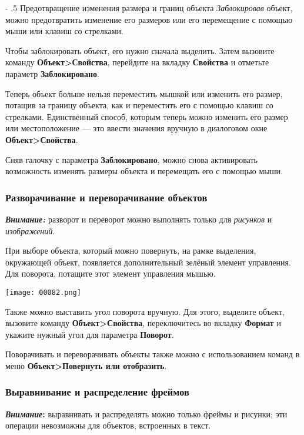 ﻿\documentclass[a4paper,10pt]{article}
\makeatletter
\renewcommand\paragraph{%
   \@startsection{paragraph}{4}{0mm}%
      {-\baselineskip}%
      {.5\baselineskip}%
      {\normalfont\normalsize\bfseries}}
\makeatother
\begin{document}
\paragraph{Предотвращение изменения размера и границ объекта}
\textit{Заблокировав} объект, можно предотвратить изменение его размеров или его перемещение с помощью мыши или клавиш со стрелками.

Чтобы заблокировать объект, его нужно сначала выделить. Затем вызовите команду \textbf{Объект>Свойства}, перейдите на вкладку \textbf{Свойства} и отметьте параметр \textbf{Заблокировано}.

Теперь объект больше нельзя переместить мышкой или изменить его размер, потащив за границу объекта, как и переместить его с помощью клавиш со стрелками. Единственный способ, которым теперь можно изменить его размер или местоположение — это ввести значения вручную в диалоговом окне \textbf{Объект>Свойства}.

Сняв галочку с параметра \textbf{Заблокировано}, можно снова активировать возможность изменять размеры объекта и перемещать его с помощью мыши.

\subsubsection{Разворачивание и переворачивание объектов}
\begin{mdframed}[backgroundcolor=blue!10]
\textbf{\textit{Внимание:}} разворот и переворот можно выполнять только для \textit{рисунков} и \textit{изображений}.
\end{mdframed}

При выборе объекта, который можно повернуть, на рамке выделения, окружающей объект, появляется дополнительный зелёный элемент управления. Для поворота, потащите этот элемент управления мышью.

\texttt{[image: 00082.png]}

Также можно выставить угол поворота вручную. Для этого, выделите объект, вызовите команду \textbf{Объект>Свойства}, переключитесь во вкладку \textbf{Формат} и укажите нужный угол для параметра \textbf{Поворот}.

Поворачивать и переворачивать объекты также можно с использованием команд в меню \textbf{Объект>Повернуть или отобразить}.

\subsubsection{Выравнивание и распределение фреймов}
\begin{mdframed}[backgroundcolor=blue!10]
\textbf{\textit{Внимание}:} выравнивать и распределять можно только фреймы и рисунки; эти операции невозможны для объектов, встроенных в текст.
\end{mdframed}
\end{document}
